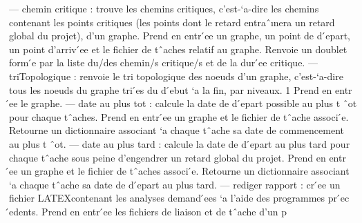 \documentclass{article}
\begin{document}
— chemin critique : trouve les chemins critiques, c’est-`a-dire les chemins contenant les points critiques (les
points dont le retard entraˆınera un retard global du projet), d’un graphe.
Prend en entr ́ee un graphe, un point de d ́epart, un point d’arriv ́ee et le fichier de tˆaches relatif au graphe.
Renvoie un doublet form ́e par la liste du/des chemin/s critique/s et de la dur ́ee critique.
— triTopologique : renvoie le tri topologique des noeuds d’un graphe, c’est-`a-dire tous les noeuds du graphe
tri ́es du d ́ebut `a la fin, par niveaux.
1
Prend en entr ́ee le graphe.
— date au plus tot : calcule la date de d ́epart possible au plus t ˆot pour chaque tˆaches.
Prend en entr ́ee un graphe et le fichier de tˆache associ ́e. Retourne un dictionnaire associant `a chaque tˆache
sa date de commencement au plus t ˆot.
— date au plus tard : calcule la date de d ́epart au plus tard pour chaque tˆache sous peine d’engendrer un
retard global du projet. Prend en entr ́ee un graphe et le fichier de tˆaches associ ́e. Retourne un dictionnaire
associant `a chaque tˆache sa date de d ́epart au plus tard.
— rediger rapport : cr ́ee un fichier LATEXcontenant les analyses demand ́ees `a l’aide des programmes pr ́ec ́edents.
Prend en entr ́ee les fichiers de liaison et de tˆache d’un p
\p
\end{document}
